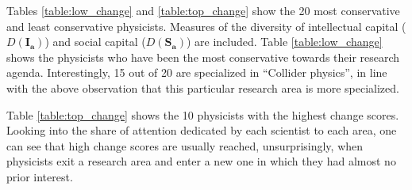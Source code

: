 \documentclass{article}
\begin{document}
 Tables \ref{table:low_change} and \ref{table:top_change} show the 20 most conservative and least conservative physicists. Measures of the diversity of intellectual capital ($D(\bm{I_a})$) and social capital ($D(\bm{S_a})$) are included. Table \ref{table:low_change} shows the physicists who have been the most conservative towards their research agenda. Interestingly, 15 out of 20 are specialized in ``Collider physics'', in line with the above observation that this particular research area is more specialized.

Table \ref{table:top_change} shows the 10 physicists with the highest change scores.  Looking into the share of attention dedicated by each scientist to each area, one can see that high change scores are usually reached, unsurprisingly, when physicists exit a research area and enter a new one in which they had almost no prior interest. 
\end{document}
